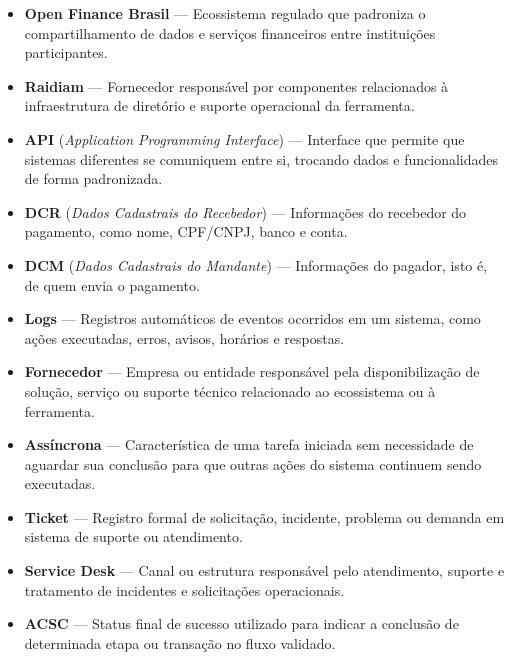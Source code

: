 \begin{itemize}
    \item \textbf{Open Finance Brasil} — Ecossistema regulado que padroniza o compartilhamento de dados e serviços financeiros entre instituições participantes.
    
    \item \textbf{Raidiam} — Fornecedor responsável por componentes relacionados à infraestrutura de diretório e suporte operacional da ferramenta.
    
    \item \textbf{API} (\textit{Application Programming Interface}) — Interface que permite que sistemas diferentes se comuniquem entre si, trocando dados e funcionalidades de forma padronizada.
    
    \item \textbf{DCR} (\textit{Dados Cadastrais do Recebedor}) — Informações do recebedor do pagamento, como nome, CPF/CNPJ, banco e conta.
    
    \item \textbf{DCM} (\textit{Dados Cadastrais do Mandante}) — Informações do pagador, isto é, de quem envia o pagamento.
    
    \item \textbf{Logs} — Registros automáticos de eventos ocorridos em um sistema, como ações executadas, erros, avisos, horários e respostas.
    
    \item \textbf{Fornecedor} — Empresa ou entidade responsável pela disponibilização de solução, serviço ou suporte técnico relacionado ao ecossistema ou à ferramenta.
    
    \item \textbf{Assíncrona} — Característica de uma tarefa iniciada sem necessidade de aguardar sua conclusão para que outras ações do sistema continuem sendo executadas.
    
    \item \textbf{Ticket} — Registro formal de solicitação, incidente, problema ou demanda em sistema de suporte ou atendimento.
    
    \item \textbf{Service Desk} — Canal ou estrutura responsável pelo atendimento, suporte e tratamento de incidentes e solicitações operacionais.
    
    \item \textbf{ACSC} — Status final de sucesso utilizado para indicar a conclusão de determinada etapa ou transação no fluxo validado.
    

\end{itemize}
